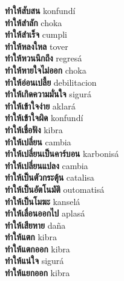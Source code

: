\textbf{ ทำให้สับสน  } konfundí \\
\textbf{ ทำให้สำลัก  } choka \\
\textbf{ ทำให้สำเร็จ  } cumpli \\
\textbf{ ทำให้หลงใหล  } tover \\
\textbf{ ทำให้หวนนึกถึง  } regresá \\
\textbf{ ทำให้หายใจไม่ออก  } choka \\
\textbf{ ทำให้อ่อนเปลี้ย  } debilitacion \\
\textbf{ ทำให้เกิดความมั่นใจ  } sigurá \\
\textbf{ ทำให้เข้าใจง่าย  } aklará \\
\textbf{ ทำให้เข้าใจผิด  } konfundí \\
\textbf{ ทำให้เชื่อฟัง  } kibra \\
\textbf{ ทำให้เปลี่ยน  } cambia \\
\textbf{ ทำให้เปลี่ยนเป็นคาร์บอน  } karbonisá \\
\textbf{ ทำให้เปลี่ยนแปลง  } cambia \\
\textbf{ ทำให้เป็นตัวกระตุ้น  } catalisa \\
\textbf{ ทำให้เป็นอัตโนมัติ  } outomatisá \\
\textbf{ ทำให้เป็นโมฆะ  } kanselá \\
\textbf{ ทำให้เลื่อนออกไป  } aplasá \\
\textbf{ ทำให้เสียหาย  } daña \\
\textbf{ ทำให้แตก  } kibra \\
\textbf{ ทำให้แตกออก  } kibra \\
\textbf{ ทำให้แน่ใจ  } sigurá \\
\textbf{ ทำให้แยกออก  } kibra \\
